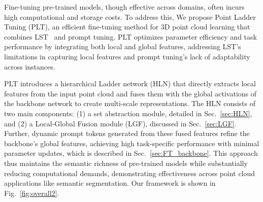 Fine-tuning pre-trained models, though effective across domains, often incurs high computational and storage costs. To address this, We propose Point Ladder Tuning (PLT), an efficient fine-tuning method for 3D point cloud learning that combines LST~\cite{sung2022lst} and prompt tuning\cite{jia2022visual}. PLT optimizes parameter efficiency and task performance by integrating both local and global features, addressing LST’s limitations in capturing local features and prompt tuning’s lack of adaptability across instances.

PLT introduces a hierarchical Ladder network (HLN) that directly extracts local features from the input point cloud and fuses them with the global activations of the backbone network to create multi-scale representations. The HLN consists of two main components: (1) a set abstraction module, detailed in Sec.~\ref{sec:HLN}, and (2) a Local-Global Fusion module (LGF), discussed in Sec.~\ref{sec:LGF}. Further, dynamic prompt tokens generated from these fused features refine the backbone’s global features, achieving high task-specific performance with minimal parameter updates, which is described in Sec.~\ref{sec:FT_backbone}. This approach thus maintains the semantic richness of pre-trained models while substantially reducing computational demands, demonstrating effectiveness across point cloud applications like semantic segmentation.
Our framework is shown in Fig.~\ref{fig:overall2}.




